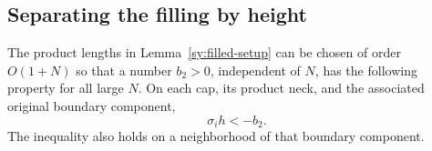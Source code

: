 \subsection{Separating the filling by height}

\begin{lemma}\label{cp:height-gap}
The product lengths in Lemma~\ref{sy:filled-setup} can be chosen
of order $O(1+N)$ so that a number $b_2>0$, independent of $N$, has the
following property for all large $N$.  On each cap, its product neck,
and the associated original boundary component,
\begin{equation}\label{cp:signed-height}
 \sigma_i h<-b_2.
\end{equation}
The inequality also holds on a neighborhood of that boundary component.
\end{lemma}

